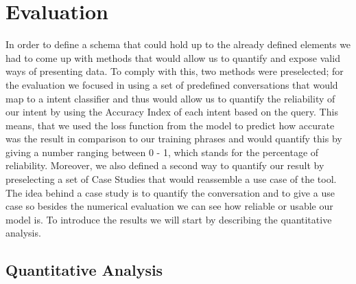 \chapter{Evaluation}


In order to define a schema that could hold up to the already defined elements we had to come up with methods that would allow us to quantify and expose valid ways of presenting data. To comply with this, two methods were preselected;  for the evaluation we focused in using a set of predefined conversations that would map to a intent classifier and thus would allow us to quantify the reliability of our intent by using the Accuracy Index of each intent based on the query. This means, that we used the loss function from the model to predict how accurate was the result in comparison to our training phrases and would quantify this by giving a number ranging between 0 - 1, which stands for the percentage of reliability. Moreover, we also defined a second way to quantify our result by preselecting a set of Case Studies that would reassemble a use case of the tool. The idea behind a case study is to quantify the conversation and to give a use case so besides the numerical evaluation we can see how reliable or usable our model is. To introduce the results we will start by describing the quantitative analysis.

\section{Quantitative Analysis}

